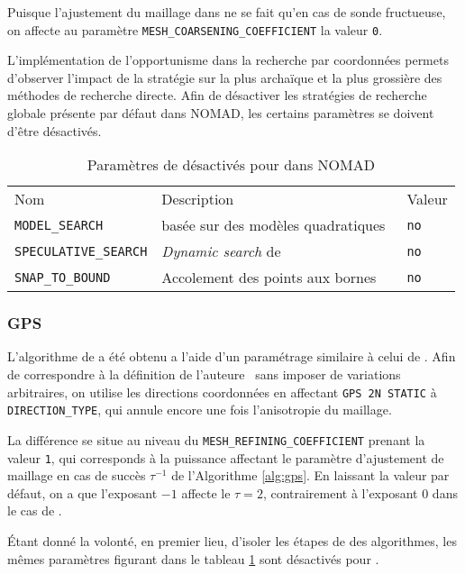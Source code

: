 Puisque l'ajustement du maillage dans \CS ne se fait qu'en cas de sonde fructueuse, on affecte au paramètre \texttt{MESH\_COARSENING\_COEFFICIENT} la valeur \texttt{0}.  
  
L'implémentation de l'opportunisme dans la recherche par coordonnées permets d'observer l'impact de la stratégie sur  la plus archaïque et la plus grossière des méthodes de recherche directe. Afin de désactiver les stratégies de recherche globale présente par défaut dans NOMAD, les certains paramètres se doivent d'être désactivés.
\begin{table}[h]
	\centering
	\begin{tabular}{||l l l||}
		\hline
		Nom & Description & Valeur\\
		\hhline{||===||}
		\texttt{MODEL\_SEARCH} & \SEARCH basée sur des modèles quadratiques~\cite{CoLed2011}& \texttt{no}\\
		\texttt{SPECULATIVE\_SEARCH} & \emph{Dynamic search} de \cite{AuDe2006} & \texttt{no}\\
		\texttt{SNAP\_TO\_BOUND} & Accolement des points aux bornes & \texttt{no}\\
		\hline
	\end{tabular}
	\caption{Paramètres de \SEARCH désactivés pour \CS dans NOMAD}\label{tab:pdc}
\end{table}
\subsubsection{GPS}\label{sec:ngp}
L'algorithme de \GPS a été obtenu a l'aide d'un paramétrage similaire à celui de \CS. Afin de correspondre à la définition de l'auteure~\cite{Torc97a} sans imposer de variations arbitraires, on utilise les directions coordonnées en affectant \texttt{GPS 2N STATIC} à \texttt{DIRECTION\_TYPE}, qui annule encore une fois l'anisotropie du maillage.

La différence se situe au niveau du \texttt{MESH\_REFINING\_COEFFICIENT} prenant la valeur \texttt{1}, qui corresponds à la puissance affectant le paramètre d'ajustement de maillage en cas de succès $\tau^{-1}$ de l'Algorithme \ref{alg:gps}. En laissant la valeur par défaut, on a que l'exposant $-1$ affecte le $\tau = 2$, contrairement à l'exposant $0$ dans le cas de \CS.

Étant donné la volonté, en premier lieu, d'isoler les étapes de \POLL des algorithmes, les mêmes paramètres figurant dans le tableau \ref{tab:pdc} sont désactivés pour \GPS.

